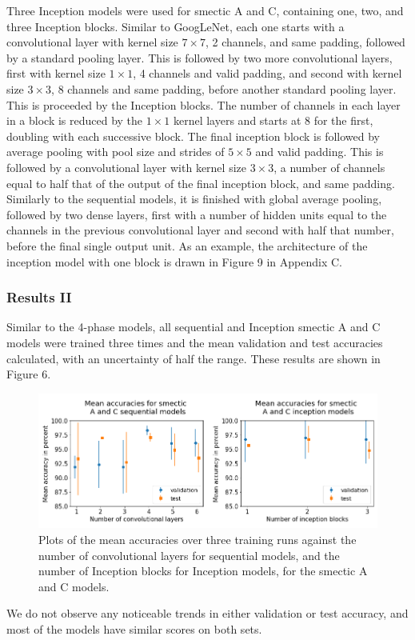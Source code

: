 \documentclass[12pt]{article}
\begin{document}
Three Inception models were used for smectic A and C, containing one, two, and three Inception blocks. Similar to GoogLeNet, each one starts with a convolutional layer with kernel size $7 \times 7$, 2 channels, and same padding, followed by a standard pooling layer. This is followed by two more convolutional layers, first with kernel size $1 \times 1$, 4 channels and valid padding, and second with kernel size $3 \times 3$, 8 channels and same padding, before another standard pooling layer. This is proceeded by the Inception blocks. The number of channels in each layer in a block is reduced by the $1 \times 1$ kernel layers and starts at 8 for the first, doubling with each successive block. The final inception block is followed by average pooling with pool size and strides of $5 \times 5$ and valid padding. This is followed by a convolutional layer with kernel size $3 \times 3$, a number of channels equal to half that of the output of the final inception block, and same padding. Similarly to the sequential models, it is finished with global average pooling, followed by two dense layers, first with a number of hidden units equal to the channels in the previous convolutional layer and second with half that number, before the final single output unit. As an example, the architecture of the inception model with one block is drawn in Figure 9 in Appendix C.
\subsubsection{Results II}
Similar to the 4-phase models, all sequential and Inception smectic A and C models were trained three times and the mean validation and test accuracies calculated, with an uncertainty of half the range. These results are shown in Figure 6. 
\begin{figure}[!ht]
	\centering
    \includegraphics[width=5.6678in]{images/smecticAC_graphs.png}
    \caption{Plots of the mean accuracies over three training runs against the number of convolutional layers for sequential models, and the number of Inception blocks for Inception models, for the smectic A and C models.}
\end{figure} 
We do not observe any noticeable trends in either validation or test accuracy, and most of the models have similar scores on both sets.
\end{document}
